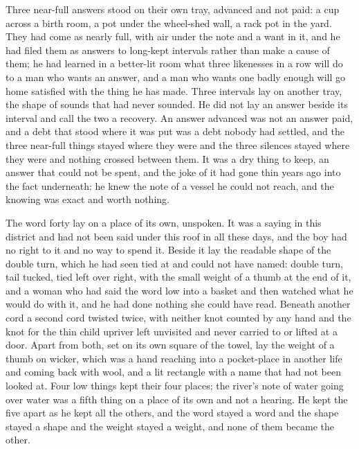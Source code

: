 Three near-full answers stood on their own tray, advanced and not paid: a cup across a birth room, a pot under the wheel-shed wall, a rack pot in the yard. They had come as nearly full, with air under the note and a want in it, and he had filed them as answers to long-kept intervals rather than make a cause of them; he had learned in a better-lit room what three likenesses in a row will do to a man who wants an answer, and a man who wants one badly enough will go home satisfied with the thing he has made. Three intervals lay on another tray, the shape of sounds that had never sounded. He did not lay an answer beside its interval and call the two a recovery. An answer advanced was not an answer paid, and a debt that stood where it was put was a debt nobody had settled, and the three near-full things stayed where they were and the three silences stayed where they were and nothing crossed between them. It was a dry thing to keep, an answer that could not be spent, and the joke of it had gone thin years ago into the fact underneath: he knew the note of a vessel he could not reach, and the knowing was exact and worth nothing.

The word forty lay on a place of its own, unspoken. It was a saying in this district and had not been said under this roof in all these days, and the boy had no right to it and no way to spend it. Beside it lay the readable shape of the double turn, which he had seen tied at  and could not have named: double turn, tail tucked, tied left over right, with the small weight of a thumb at the end of it, and a woman who had said the word low into a basket and then watched what he would do with it, and he had done nothing she could have read. Beneath another cord a second cord twisted twice, with neither knot counted by any hand and the knot for the thin child upriver left unvisited and never carried to  or lifted at a door. Apart from both, set on its own square of the towel, lay the weight of a thumb on wicker, which was a hand reaching into a pocket-place in another life and coming back with wool, and a lit rectangle with a name that had not been looked at. Four low things kept their four places; the river's note of water going over water was a fifth thing on a place of its own and not a hearing. He kept the five apart as he kept all the others, and the word stayed a word and the shape stayed a shape and the weight stayed a weight, and none of them became the other.

\scenebreak

